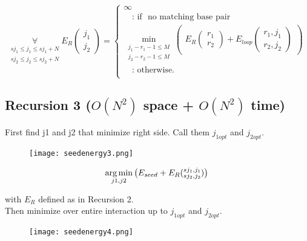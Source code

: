 \begin{equation*}
\underset{\substack{sj_{1} \le j_{1} \le sj_{1}+N\\sj_{2} \le j_{2} \le sj_{2}+N}}{\forall}
E_R(\substack{j_1\\j_2}) = \begin{cases}
\infty\\
\quad\text{: if } \text{ no matching base pair }\\
\min\limits_{\substack{j_{1}-r_{1}-1 \le M\\j_{2}-r_{2}-1 \le M}}
\begin{pmatrix}
E_R(\substack{r_1\\r_2}) + E_{loop}(\substack{r_1,j_1\\r_2,j_2})
\end{pmatrix}\\
\quad\text{: otherwise.}\\

\end{cases}
\end{equation*}

\clearpage

\subsection{Recursion 3 ($O(N^{2})$ space + $O(N^{2})$ time)}

First find j1 and j2 that minimize right side. Call them $j_{1opt}$ and $j_{2opt}$. 

\begin{figure}[H]
	\centering
	\texttt{[image: seedenergy3.png]}
\end{figure}

\begin{equation*}
\underset{j1, j2}{\arg\min}
\begin{pmatrix}
E_{seed} + E_{R}(\substack{sj_1,j_1\\sj_2,j_2})
\end{pmatrix}\\
\end{equation*}

with $E_{R}$ defined as in Recursion 2.\\
Then minimize over entire interaction up to $j_{1opt}$ and $j_{2opt}$.

\begin{figure}[H]
	\centering
	\texttt{[image: seedenergy4.png]}
\end{figure}

